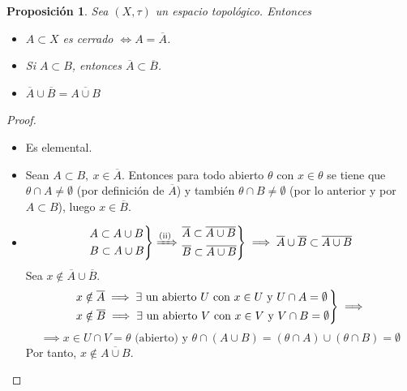 \documentclass[12pt]{report}
\newtheorem{proposition}{Proposición}[chapter]
\theoremstyle{definition}
\theoremstyle{definition}
\theoremstyle{remark}
\begin{document}
\begin{proposition}
Sea $(X,\tau)$ un espacio topológico. Entonces
\begin{itemize}
    \item[(i)] $A \subset X$ es cerrado $\iff A = \overline{A}$. 
    \item[(ii)] Si $A \subset B$, entonces $\overline{A} \subset \overline{B}$.
    \item[(iii)] $\overline{A} \cup \overline{B} = \overline{A \cup B}$
\end{itemize}
\end{proposition}

\begin{proof}
\hfill
\begin{itemize}
    \item[(i)] Es elemental.
    \item[(ii)] Sean $A \subset B, \ x \in \overline{A}$. Entonces para todo abierto $\theta$ con $x \in \theta$ se tiene que $\theta \cap A \neq \emptyset$ (por definición de $\overline{A}$) y también $\theta \cap B \neq \emptyset$ (por lo anterior y por $A \subset B$), luego $x \in \overline{B}$.
    \item[(iii)] \fbox[rb]{$\subset$} 
    \[
    \begin{rcases}
    A \subset A \cup B \\
    B \subset A \cup B
    \end{rcases} \xRightarrow{\text{(ii)}}
    \begin{rcases}
    \overline{A} \subset \overline{A \cup B} \\
    \overline{B} \subset \overline{A \cup B}
    \end
    {rcases} \implies \overline{A} \cup \overline{B} \subset \overline{A \cup B}
    \]
    \fbox[rb]{$\supset$} Sea $x \notin \overline{A} \cup \overline{B}$.
    \[
    \begin{rcases}
        x \notin \overline{A} \implies \exists $ un abierto $U$ con $x \in U$ y $U \cap A = \emptyset \\
        x \notin \overline{B} \implies \exists $ un abierto $V$ con $x \in V$ y $V \cap B = \emptyset
    \end{rcases} \implies
    \]
    \[\implies x \in U \cap V = \theta \textrm{ (abierto) y } \theta \cap (A \cup B) = (\theta \cap A) \cup (\theta \cap B) = \emptyset\] Por tanto, $x \notin \overline{A \cup B}$.
\end{itemize}
\end{proof}
\end{document}
